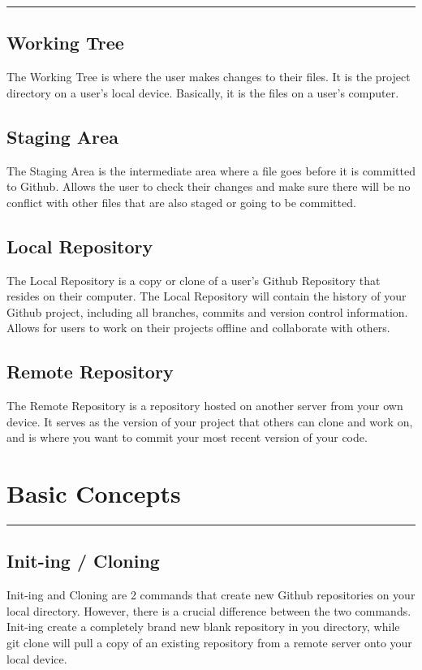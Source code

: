\documentclass{article}
\begin{document}
\vspace{15pt}
\hrule

\subsection*{Working Tree}
The Working Tree is where the user makes changes to their files. It is the project directory on a user's local device. Basically, it is the files on a user's computer.
\vspace{15pt}

\subsection*{Staging Area}
The Staging Area is the intermediate area where a file goes before it is committed to Github. Allows the user to check their changes and make sure there will be no conflict with other files that are also staged or going to be committed.
\vspace{15pt}

\subsection*{Local Repository}
The Local Repository is a copy or clone of a user's Github Repository that resides on their computer. The Local Repository will contain the history of your Github project, including all branches, commits and version control information. Allows for users to work on their projects offline and collaborate with others.
\vspace{15pt}

\subsection*{Remote Repository}
The Remote Repository is a repository hosted on another server from your own device. It serves as the version of your project that others can clone and work on, and is where you want to commit your most recent version of your code.
\vspace{5pt}

\section*{Basic Concepts}
\hrule
\vspace{25pt}
\subsection*{Init-ing / Cloning}
Init-ing and Cloning are 2 commands that create new Github repositories on your local directory. However, there is a crucial difference between the two commands. Init-ing create a completely brand new blank repository in you directory, while git clone will pull a copy of an existing repository from a remote server onto your local device.
\vspace{15pt}
\end{document}
